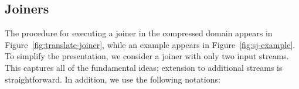 
\subsection*{Joiners}


The procedure for executing a joiner in the compressed domain appears
in Figure~\ref{fig:translate-joiner}, while an example appears in
Figure~\ref{fig:sj-example}.  To simplify the presentation, we
consider a joiner with only two input streams.  This captures all of
the fundamental ideas; extension to additional streams is
straightforward.  In addition, we use the following notations:

